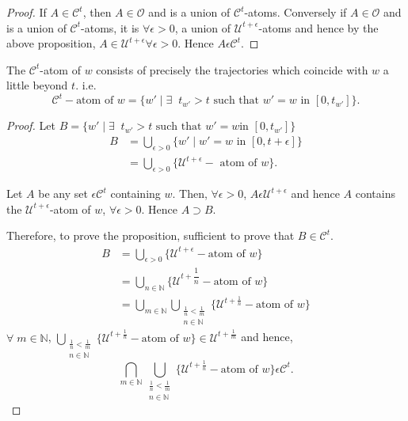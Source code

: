 \begin{proof}
If $A \in \mathscr{C}^t$, then $A \in \mathscr{O}$ and is a union of
$\mathscr{C}^t$-atoms. Conversely if $A \in \mathscr{O}$ and is a
union of $\mathscr{C}^t$-atoms, it is $\forall \epsilon > 0$,  a union of
$\mathcal{U}^{t+\epsilon}$-atoms and hence by the above proposition,
$A \in \mathscr{U}^{t+\epsilon} \forall \epsilon >0$. Hence $A
\epsilon \mathscr{C}^t$.
\end{proof}

\begin{proposition}\label{part2:chap7:prop110}
The $\mathscr{C}^t$-atom of $w$ consists of precisely the trajectories
which coincide with $w$ a little beyond $t$. i.e.
$$ 
\mathscr{C}^t-\text{atom of  } w = \{ w' \mid \exists \;\; t_{w'} > t
\text{ such that } w' = w \text{ in } [0, t_{w'}]\}. 
$$
\end{proposition}

\begin{proof}
Let $B = \{w'\mid \exists \;\; t_{w'} >t \text{ such that } w' = w \text{
  in } [0, t_{w'}]\}$
\begin{align*}
B & = \bigcup\limits_{\epsilon > 0} \{w' \mid w' = w\text{ in } [0, t+
\epsilon]\}\\
&  =  \bigcup\limits_{\epsilon > 0}
\{\mathcal{U}^{t+\epsilon}-\text{ atom of } w\}. 
\end{align*}

Let $A$ be any set $\epsilon \mathscr{C}^t$ containing $w$. Then,
$\forall \epsilon >0$, $A \epsilon \mathcal{U}^{t+\epsilon}$ and hence
$A$ contains the $\mathcal{U}^{t+\epsilon}$-atom of $w$, $\forall
\epsilon >0$. Hence $A \supset B$.

Therefore, to prove the proposition, sufficient to prove that $B \in
\mathscr{C}^t$. 
\begin{align*}
B & = \bigcup\limits_{\epsilon >0}
\{\mathcal{U}^{t+\epsilon}-\text{atom  of }w\}\\
& = \bigcup\limits_{n \in\mathbb{N}}
\{\mathcal{U}^{t+\dfrac{1}{n}}- \text{atom of } w\}\\
& = \bigcup\limits_{m \in \mathbb{N}}
\bigcup\limits_{\substack{\frac{1}{n} < \frac{1}{m} \\ n \in
    \mathbb{N}}} \{\mathcal{U}^{t+\frac{1}{n}} -\text{atom of } w\}
\end{align*}
$\forall \; m \in \mathbb{N}$, $\bigcup\limits_{\substack{\frac{1}{n}
    < \frac{1}{m} \\ n \in \mathbb{N}}} \{\mathcal{U}^{t+
  \frac{1}{n}}-\text{atom  of } w \} \in \mathcal{U}^{t+\frac{1}{m}}$
and hence, 
$$
\bigcap\limits_{m \in \mathbb{N}}
\bigcup\limits_{\substack{\frac{1}{n} < \frac{1}{m}\\n \in
    \mathbb{N}}} \{\mathcal{U}^{t+\frac{1}{n}}-\text{atom of } w\}
\epsilon \mathscr{C}^t.
$$
\end{proof}

